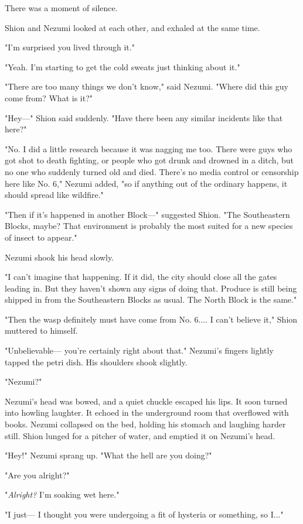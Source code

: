 There was a moment of silence.

Shion and Nezumi looked at each other, and exhaled at the same time.

"I'm surprised you lived through it."

"Yeah. I'm starting to get the cold sweats just thinking about it."

"There are too many things we don't know," said Nezumi. "Where did this
guy come from? What is it?"

"Hey---" Shion said suddenly. "Have there been any similar incidents like
that here?"

"No. I did a little research because it was nagging me too. There were
guys who got shot to death fighting, or people who got drunk and drowned
in a ditch, but no one who suddenly turned old and died. There's no
media control or censorship here like No. 6," Nezumi added, "so if
anything out of the ordinary happens, it should spread like wildfire."

"Then if it's happened in another Block---" suggested Shion. "The
Southeastern Blocks, maybe? That environment is probably the most suited
for a new species of insect to appear."

Nezumi shook his head slowly.

"I can't imagine that happening. If it did, the city should close all
the gates leading in. But they haven't shown any signs of doing that.
Produce is still being shipped in from the Southeastern Blocks as usual.
The North Block is the same."

"Then the wasp definitely must have come from No. 6.... I can't believe
it," Shion muttered to himself.

"Unbelievable--- you're certainly right about that." Nezumi's fingers
lightly tapped the petri dish. His shoulders shook slightly.

"Nezumi?"

Nezumi's head was bowed, and a quiet chuckle escaped his lips. It soon
turned into howling laughter. It echoed in the underground room that
overflowed with books. Nezumi collapsed on the bed, holding his stomach
and laughing harder still. Shion lunged for a pitcher of water, and
emptied it on Nezumi's head.

"Hey!" Nezumi sprang up. "What the hell are you doing?"

"Are you alright?"

"\emph{Alright?} I'm soaking wet here."

"I just--- I thought you were undergoing a fit of hysteria or something,
so I..."

